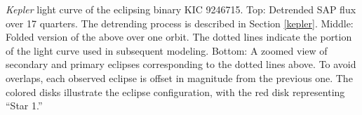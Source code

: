 \label{fig:keplerfig} \emph{Kepler} light curve of the eclipsing binary KIC 9246715. Top: Detrended SAP flux over 17 quarters. The detrending process is described in Section \ref{kepler}. Middle: Folded version of the above over one orbit. The dotted lines indicate the portion of the light curve used in subsequent modeling. Bottom: A zoomed view of secondary and primary eclipses corresponding to the dotted lines above. To avoid overlaps, each observed eclipse is offset in magnitude from the previous one. The colored disks illustrate the eclipse configuration, with the red disk representing ``Star 1.''
  